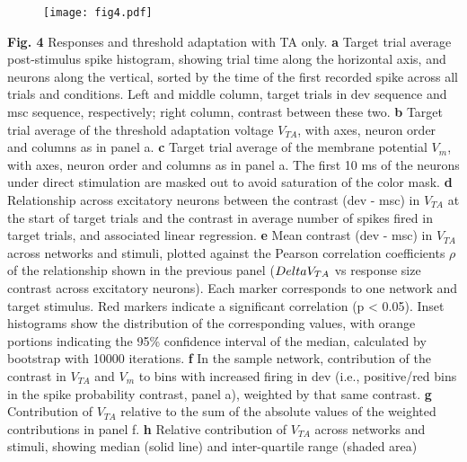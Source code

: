 \documentclass[pdflatex,referee,iicol,sn-basic]{sn-jnl}
\theoremstyle{thmstyleone}%
\theoremstyle{thmstyletwo}%
\theoremstyle{thmstylethree}%
\begin{document}
\begin{figure*}%
    \centering
    \texttt{[image: fig4.pdf]}
    \caption{}
    \label{fig4}
\end{figure*}
\textbf{Fig. 4} Responses and threshold adaptation with TA only.
\textbf{a} Target trial average post-stimulus spike histogram, showing trial time along the horizontal axis, and neurons along the vertical, sorted by the time of the first recorded spike across all trials and conditions. Left and middle column, target trials in dev sequence and msc sequence, respectively; right column, contrast between these two.
\textbf{b} Target trial average of the threshold adaptation voltage $V_{TA}$, with axes, neuron order and columns as in panel a.
\textbf{c} Target trial average of the membrane potential $V_m$, with axes, neuron order and columns as in panel a. The first 10 ms of the neurons under direct stimulation are masked out to avoid saturation of the color mask.
\textbf{d} Relationship across excitatory neurons between the contrast (dev - msc) in $V_{TA}$ at the start of target trials and the contrast in average number of spikes fired in target trials, and associated linear regression.
\textbf{e} Mean contrast (dev - msc) in $V_{TA}$ across networks and stimuli, plotted against the Pearson correlation coefficients $\rho$ of the relationship shown in the previous panel ($\\Delta V_{TA}$ vs response size contrast across excitatory neurons). Each marker corresponds to one network and target stimulus. Red markers indicate a significant correlation (p < 0.05). Inset histograms show the distribution of the corresponding values, with orange portions indicating the 95\% confidence interval of the median, calculated by bootstrap with 10000 iterations.
\textbf{f} In the sample network, contribution of the contrast in $V_{TA}$ and $V_m$ to bins with increased firing in dev (i.e., positive/red bins in the spike probability contrast, panel a), weighted by that same contrast.
\textbf{g} Contribution of $V_{TA}$ relative to the sum of the absolute values of the weighted contributions in panel f.
\textbf{h} Relative contribution of $V_{TA}$ across networks and stimuli, showing median (solid line) and inter-quartile range (shaded area)
\end{document}
